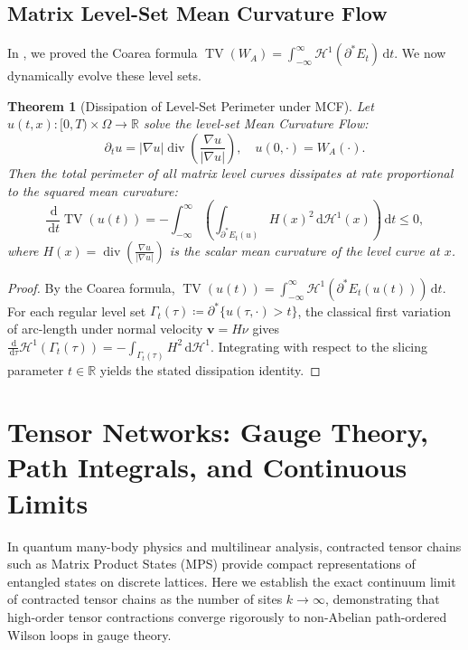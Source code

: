\documentclass[11pt,a4paper,reqno]{amsart}
\newtheorem{theorem}{Theorem}[section]
\theoremstyle{definition}
\numberwithin{equation}{section}
\newcommand{\R}{\mathbb{R}}
\newcommand{\TV}{\operatorname{TV}}
\newcommand{\dif}{\,\mathrm{d}}
\begin{document}
\subsection{Matrix Level-Set Mean Curvature Flow}
In \cite{turing2026beyond}, we proved the Coarea formula $\TV(W_A) = \int_{-\infty}^\infty \mathcal{H}^1(\partial^* E_t) \dif t$. We now dynamically evolve these level sets.

\begin{theorem}[Dissipation of Level-Set Perimeter under MCF]
\label{thm:mean_curvature_coarea}
Let $u(t, x) \colon [0, T) \times \Omega \to \R$ solve the level-set Mean Curvature Flow:
\begin{equation}
    \label{eq:mcf_pde}
    \partial_t u = |\nabla u| \operatorname{div}\left( \frac{\nabla u}{|\nabla u|} \right), \quad u(0, \cdot) = W_A(\cdot).
\end{equation}
Then the total perimeter of all matrix level curves dissipates at rate proportional to the squared mean curvature:
\begin{equation}
    \frac{\dif}{\dif t} \TV(u(t)) = -\int_{-\infty}^\infty \left( \int_{\partial^* E_t(u)} H(x)^2 \dif \mathcal{H}^1(x) \right) \dif t \le 0,
\end{equation}
where $H(x) = \operatorname{div}(\frac{\nabla u}{|\nabla u|})$ is the scalar mean curvature of the level curve at $x$.
\end{theorem}
\begin{proof}
By the Coarea formula, $\TV(u(t)) = \int_{-\infty}^\infty \mathcal{H}^1(\partial^* E_t(u(t))) \dif t$. For each regular level set $\Gamma_t(\tau) \coloneqq \partial^* \{u(\tau, \cdot) > t\}$, the classical first variation of arc-length under normal velocity $\mathbf{v} = H \nu$ gives $\frac{\dif}{\dif \tau} \mathcal{H}^1(\Gamma_t(\tau)) = -\int_{\Gamma_t(\tau)} H^2 \dif \mathcal{H}^1$. Integrating with respect to the slicing parameter $t \in \R$ yields the stated dissipation identity.
\end{proof}

\section{Tensor Networks: Gauge Theory, Path Integrals, and Continuous Limits}
\label{sec:tensor_networks}

In quantum many-body physics and multilinear analysis, contracted tensor chains such as Matrix Product States (MPS) provide compact representations of entangled states on discrete lattices. Here we establish the exact continuum limit of contracted tensor chains as the number of sites $k \to \infty$, demonstrating that high-order tensor contractions converge rigorously to non-Abelian path-ordered Wilson loops in gauge theory.
\end{document}
